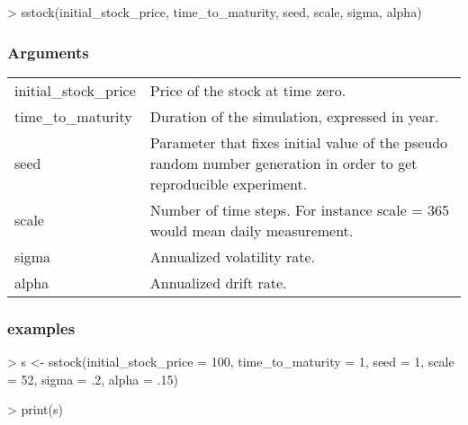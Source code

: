\documentclass[12pt]{report}
\begin{document}
\begin{appendices}
\begin{Schunk}
\begin{Sinput}
> sstock(initial_stock_price, time_to_maturity, 
        seed, scale, sigma, alpha)
\end{Sinput}
\end{Schunk}

\subsubsection*{Arguments}

\begin{tabularx}{\textwidth}{lX}
  initial\_stock\_price & Price of the stock at time zero.\\
  time\_to\_maturity & Duration of the simulation, expressed in year.\\
  seed & Parameter that fixes initial value of the pseudo random number generation in order to get reproducible experiment. \\
  scale & Number of time steps. For instance scale = 365 would mean daily measurement.\\
  sigma & Annualized volatility rate. \\
  alpha & Annualized drift rate.
\end{tabularx}

\subsubsection*{examples}
\label{sec:r:time:geometric:ex}

\begin{Schunk}
\begin{Sinput}
> s <- sstock(initial_stock_price = 100,
        time_to_maturity = 1,
        seed = 1,
        scale = 52,
        sigma = .2,
        alpha = .15)
\end{Sinput}
\end{Schunk}


\begin{Schunk}
\begin{Sinput}
> print(s)
\end{Sinput}
\end{Schunk}


\end{appendices}
\end{document}
